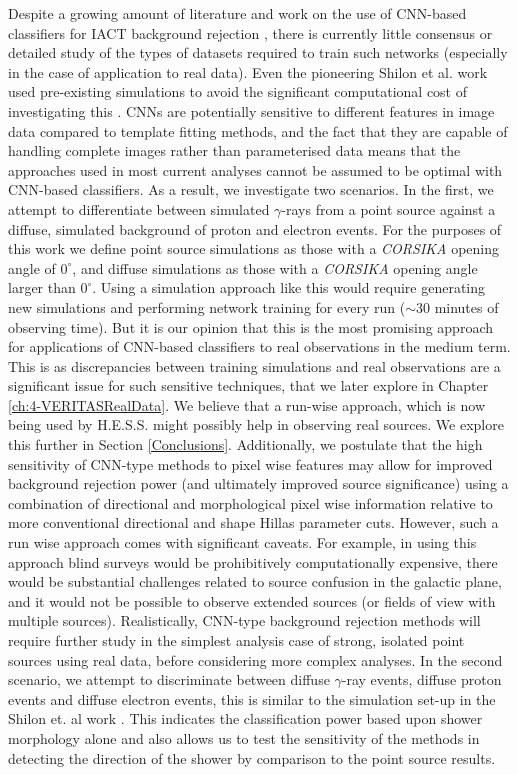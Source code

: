 Despite a growing amount of literature and work on the use of CNN-based classifiers for IACT background rejection \cite{Shilon,samicrc,dl1dh}, there is currently little consensus or detailed study of the types of datasets required to train such networks (especially in the case of application to real data). Even the pioneering Shilon et al. work used pre-existing simulations to avoid the significant computational cost of investigating this \cite{Shilon}. CNNs are potentially sensitive to different features in image data compared to template fitting methods, and the fact that they are capable of handling complete images rather than parameterised data means that the approaches used in most current analyses cannot be assumed to be optimal with CNN-based classifiers. As a result, we investigate two scenarios. In the first, we attempt to differentiate between simulated $\gamma$-rays from a point source against a diffuse, simulated background of proton and electron events. For the purposes of this work we define point source simulations as those with a \textit{CORSIKA} opening angle of $0^{\circ}$, and diffuse simulations as those with a \textit{CORSIKA} opening angle larger than $0^{\circ}$. Using a simulation approach like this would require generating new simulations and performing network training for every run ($\sim$30 minutes of observing time). But it is our opinion that this is the most promising approach for applications of CNN-based classifiers to real observations in the medium term. This is as discrepancies between training simulations and real observations are a significant issue for such sensitive techniques, that we later explore in Chapter \ref{ch:4-VERITASRealData}. We believe that a run-wise approach, which is now being used by H.E.S.S. \cite{rws} might possibly help in observing real sources. We explore this further in Section \ref{Conclusions}. Additionally, we postulate that the high sensitivity of CNN-type methods to pixel wise features may allow for improved background rejection power (and ultimately improved source significance) using a combination of directional and morphological pixel wise information relative to more conventional directional and shape Hillas parameter cuts. However, such a run wise approach comes with significant caveats. For example, in using this approach blind surveys would be prohibitively computationally expensive, there would be substantial challenges related to source confusion in the galactic plane, and it would not be possible to observe extended sources (or fields of view with multiple sources). Realistically, CNN-type background rejection methods will require further study in the simplest analysis case of strong, isolated point sources using real data, before considering more complex analyses. In the second scenario, we attempt to discriminate between diffuse $\gamma$-ray events, diffuse proton events and diffuse electron events, this is similar to the simulation set-up in the Shilon et. al work \cite{Shilon}. This indicates the classification power based upon shower morphology alone and also allows us to test the sensitivity of the methods in detecting the direction of the shower by comparison to the point source results. 
